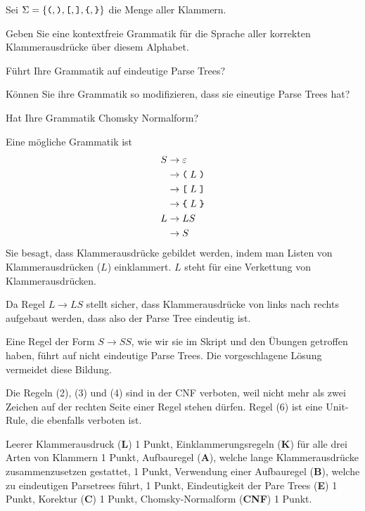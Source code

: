 Sei $\Sigma=\{
\texttt{(},
\texttt{)},
\texttt{[},
\texttt{]},
\verb+{+,
\verb+}+
\}$
die Menge aller Klammern.
\begin{teilaufgaben}
\item
Geben Sie eine kontextfreie Grammatik für die Sprache aller korrekten
Klammerausdrücke über diesem Alphabet.
\item
Führt Ihre Grammatik auf eindeutige Parse Trees?
\item
Können Sie ihre Grammatik so modifizieren, dass sie eineutige Parse Trees hat?
\item
Hat Ihre Grammatik Chomsky Normalform?
\end{teilaufgaben}


\begin{loesung}
\begin{teilaufgaben}
\item
Eine mögliche Grammatik ist
\begin{align}
S&\rightarrow \varepsilon 
\\
 &\rightarrow \texttt{(} \; L \; \texttt{)}
\\
 &\rightarrow \texttt{[} \; L \; \texttt{]}
\\
 &\rightarrow \texttt{\char`\{} \; L \; \texttt{\char`\}}
\\
L&\rightarrow LS
\\
 &\rightarrow S
\end{align}
Sie besagt, dass Klammerausdrücke gebildet werden, indem man Listen
von Klammerausdrücken ($L$) einklammert.
$L$ steht für eine Verkettung von Klammerausdrücken.
\item
Da Regel $L\rightarrow LS$ stellt sicher, dass Klammerausdrücke von links
nach rechts aufgebaut werden, dass also der Parse Tree eindeutig ist.
\item
Eine Regel der Form $S\rightarrow SS$, wie wir sie im Skript und den
Übungen getroffen haben, führt auf nicht eindeutige Parse Trees.
Die vorgeschlagene Lösung vermeidet diese Bildung.
\item
Die Regeln 
(2), (3) und (4) sind in der CNF verboten, weil nicht mehr als zwei
Zeichen auf der rechten Seite einer Regel stehen dürfen.
Regel (6) ist eine Unit-Rule, die ebenfalls verboten ist.
\qedhere
\end{teilaufgaben}
\end{loesung}

\begin{bewertung}
Leerer Klammerausdruck ({\bf L}) 1 Punkt,
Einklammerungsregeln ({\bf K}) für alle drei Arten von Klammern 1 Punkt,
Aufbauregel ({\bf A}), welche lange Klammerausdrücke zusammenzusetzen
gestattet, 1 Punkt,
Verwendung einer Aufbauregel ({\bf B}), welche zu eindeutigen Parsetrees führt,
1 Punkt,
Eindeutigkeit der Pare Trees ({\bf E}) 1 Punkt,
Korektur ({\bf C}) 1 Punkt,
Chomsky-Normalform ({\bf CNF}) 1 Punkt.
\end{bewertung}


